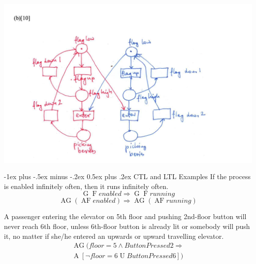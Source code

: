 \documentclass[letterpaper, 8pt]{extarticle}
\makeatletter
\renewcommand{\section}{\@startsection{section}{1}{0mm}%
                                {-1ex plus -.5ex minus -.2ex}%
                                {0.5ex plus .2ex}%
                                {\normalfont\normalsize\bfseries}}
\DeclareMathOperator{\F}{F}
\DeclareMathOperator{\G}{G}
\DeclareMathOperator{\U}{U}
\DeclareMathOperator{\A}{A}
\DeclareMathOperator{\AG}{AG}
\DeclareMathOperator{\AF}{AF}
\makeatother
\begin{document}
\begin{multicols*}{5}
  \includegraphics[width = \linewidth]{warring_neighbours_partb.png}

  \section{CTL and LTL Examples}
  If the process is enabled infinitely often, then it runs infinitely often.
  $$
    \G\F enabled \Rightarrow \G\F running
  $$
  $$
    \AG(\AF enabled) \Rightarrow \AG(\AF running)
  $$

  A passenger entering the elevator on 5th floor and pushing 2nd-floor button will never reach 6th floor, unless 6th-floor button is already lit or somebody will push it, no matter if she/he entered an upwards or upward travelling elevator.
  \begin{align*}
    \AG(floor=5 \land ButtonPressed2 \Rightarrow \\
    \A[\neg floor=6 \U ButtonPressed6])
  \end{align*}


\end{multicols*}
\end{document}
